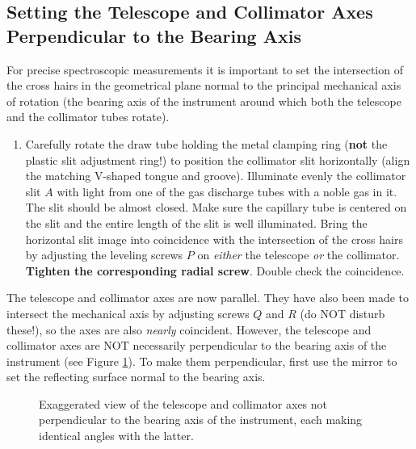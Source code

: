 \documentclass[12pt]{article}
\begin{document}
\subsection{Setting the Telescope and Collimator Axes Perpendicular to the Bearing Axis}
For precise spectroscopic measurements it is important to set the intersection of the cross hairs in the geometrical plane normal to the principal mechanical axis of rotation (the bearing axis of the instrument around which both the telescope and the collimator tubes rotate).
\begin{enumerate}
    \item Carefully rotate the draw tube holding the metal clamping ring (\textbf{not} the plastic slit adjustment ring!) to position the collimator slit horizontally (align the matching V-shaped tongue and groove). Illuminate evenly the collimator slit $A$ with light from one of the gas discharge tubes with a noble gas in it. The slit should be almost closed. Make sure the capillary tube is centered on the slit and the entire length of the slit is well illuminated. Bring the horizontal slit image into coincidence with the intersection of the cross hairs by adjusting the leveling screws $P$ on \textit{either} the telescope \textit{or} the collimator. \textbf{Tighten the corresponding radial screw}. Double check the coincidence.
\end{enumerate}

The telescope and collimator axes are now parallel. They have also been made to intersect the mechanical axis by adjusting screws $Q$ and $R$ (do NOT disturb these!), so the axes are also \textit{nearly} coincident. However, the telescope and collimator axes are NOT necessarily perpendicular to the bearing axis of the instrument (see Figure \ref{Bearing axis}). To make them perpendicular, first use the mirror to set the reflecting surface normal to the bearing axis.

\begin{figure}[ht!]
    \centering
    \caption{Exaggerated view of the telescope and collimator axes not perpendicular to the bearing axis of the instrument, each making identical angles with the latter.}
    \label{Bearing axis}
\end{figure}
\end{document}
